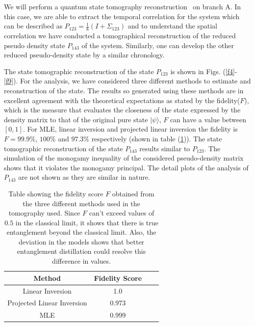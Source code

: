 \documentclass[fleqn,usenatbib]{mnras}
\begin{document}
We will perform a quantum state tomography reconstruction~\citep{bog,daniel12} on branch A. In this case, we are able to extract the temporal correlation for the system which can be described as $P_{123} = \frac{1}{8}(I+ \Sigma_{123})$ and to understand the spatial correlation we have conducted a tomographical reconstruction of the reduced pseudo density state $P_{143}$ of the system. Similarly, one can develop the other reduced pseudo-density state by a similar chronology.

The state tomographic reconstruction of the state $P_{123}$ is shown in Figs. (\ref{f4}-\ref{f9}). For the analysis, we have considered three different methods to estimate and reconstruction of the state. The results so generated using these methods are in excellent agreement with the theoretical expectations as stated by the fidelity($F$), which is the measure that evaluates the closeness of the state expressed by the density matrix to that of the original pure state $|\psi\rangle$, $F$ can have a value between $[0,1]$. For MLE, linear inversion and projected linear inversion the fidelity is $F= 99.9\%$, $100\%$ and $97.3\%$ respectively (shown in table (\ref{table1})). The state tomographic reconstruction of the state $P_{143}$ results similar to $P_{123}$. The simulation of the monogamy inequality of the considered pseudo-density matrix shows that it violates the monogamy principal. The detail plots of the analysis of $P_{143}$ are not shown as they are similar in nature. 



\begin{table}
    \centering
     \begin{center}
 \begin{tabular}{||c c c c||} 
 \hline
 Method & Fidelity Score  \\ [0.7ex] 
 \hline\hline
 Linear Inversion & 1.0 \\ 
 \hline
 Projected Linear Inversion & 0.973 \\
 \hline
 MLE & 0.999 \\
 \hline
\end{tabular}
\end{center}
    \caption{Table showing the fidelity score $F$ obtained from the three different methods used in the tomography used. Since $F$ can't exceed values of $0.5$ in the classical limit, it shows that there is true entanglement beyond the classical limit. Also, the deviation in the models shows that better entanglement distillation could resolve this difference in values.}
    \label{table1}
\end{table}
\end{document}
